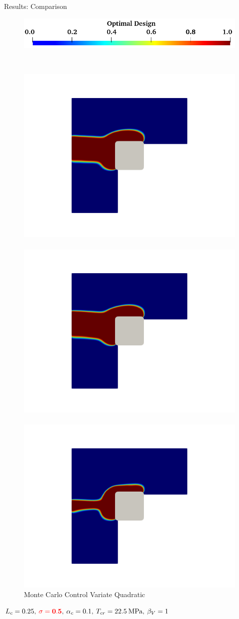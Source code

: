\documentclass[10pt,xcolor=dvipsnames,compress]{beamer}
\begin{document}
\begin{frame}{Results: Comparison}
\begin{figure}
        \centering
        \includegraphics[width=0.35\linewidth]{Figures/design_contour_2.png}
    \end{figure}
    \vspace{-0.1in}\\
    \begin{figure}
        \centering
        \footnotesize
        \includegraphics[trim={3.6in 1.8in 3.5in 2.5in},clip,width=0.25\linewidth]{Figures/HU1.png}\hspace{0.1in}~
        \includegraphics[trim={3.6in 1.8in 3.5in 2.5in},clip,width=0.25\linewidth]{Figures/HU2.png}\hspace{0.1in}~
        \includegraphics[trim={3.6in 1.8in 3.5in 2.5in},clip,width=0.25\linewidth]{Figures/HU3.png}\\
        \footnotesize{Monte Carlo \hspace{0.6 in} { Control Variate} \hspace{0.6 in} Quadratic } \vspace{0.1 in}\\
        \label{fig:enter-label}
    \end{figure}
    \centering
    $L_c = 0.25, \: {\color{red}\bf \sigma= 0.5},\: \alpha_c = 0.1, \:T_{cr} = 22.5 \:\text{MPa},\: \beta_{V} = 1$
\end{frame}
\end{document}

